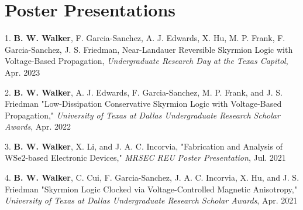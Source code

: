 \documentclass[letterpaper,11pt]{article}
\begin{document}
\section{Poster Presentations}
    \begin{itemize}[leftmargin=0.15in, label={}]
        \small{\item{
        1.\textbf{\hspace{3pt} B. W. Walker}, F. Garcia-Sanchez, A. J. Edwards, X. Hu, M. P. Frank, F. Garcia-Sanchez, J. S. Friedman, Near-Landauer Reversible Skyrmion Logic with Voltage-Based Propagation, \textit{Undergraduate Research Day at the Texas Capitol}, Apr. 2023}
        }\vspace{-5pt}
        \small{\item{
        2.\textbf{\hspace{3pt} B. W. Walker}{, A. J. Edwards, F. Garcia-Sanchez, M. P. Frank, and J. S. Friedman "Low-Dissipation Conservative Skyrmion Logic with Voltage-Based Propagation," \textit{University of Texas at Dallas Undergraduate Research Scholar Awards}, Apr. 2022}
        }}\vspace{-5pt}
        \small{\item{
         3.\textbf{\hspace{3pt} B. W. Walker}, X. Li, and J. A. C. Incorvia, {"Fabrication and Analysis of WSe2-based Electronic Devices," \textit{MRSEC REU Poster Presentation}, Jul. 2021}
        }}\vspace{-5pt}
        \small{\item{
         4.\textbf{\hspace{3pt} B. W. Walker}{, C. Cui, F. Garcia-Sanchez, J. A. C. Incorvia, X. Hu, and J. S. Friedman "Skyrmion Logic Clocked via Voltage-Controlled Magnetic Anisotropy," \textit{University of Texas at Dallas Undergraduate Research Scholar Awards}, Apr. 2021}
        }}\vspace{-5pt}
     \end{itemize}
\end{document}
